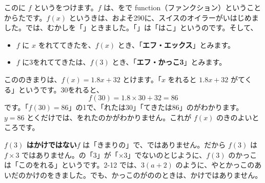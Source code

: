このに $f$ というをつけます。$f$ は、をで function（ファンクション）ということからたです。$f(x)$ というきは、およそ290に、スイスのオイラーがいはじめました。では、むかしを「」ときました。「」は「はこ」というのです。そして、
\begin{itemize}[leftmargin=1.6\zw, itemsep=1pt, topsep=2pt, label={\color{\bkTT}●}]
\item {} $f$ に $x$ をれててきたを、$f(x)$ とき、「\textbf{エフ・エックス}」とみます。
\item {} $f$ に3をれててきたは、$f(3)$ とき、「\textbf{エフ・かっこ3}」とみます。
\end{itemize}
こののきまりは、$f(x)=1.8x+32$ とけます。「$x$ をれると $1.8x+32$ がてくる」というです。30をれると、
\[ f(30)=1.8\times30+32=86 \]
です。「$f(30)=86$」の1で、「れたは30」「てきたは86」のがわかります。$y=86$ とくだけでは、をれたのかがわかりません。これが $f(x)$ のきのよいところです。

\textbf{$f(3)$ はかけではない}\quad $f$ は「きまりの」で、ではありません。だから $f(3)$ は $f\times3$ ではありません。の「3」が「×3」でないのとじように、$f(3)$ のかっこは「このをれる」というです。2-12 では、$3(a+2)$ のように、やとかっこのあいだのかけのをきました。でも、かっこのがののときは、かけではありません。

